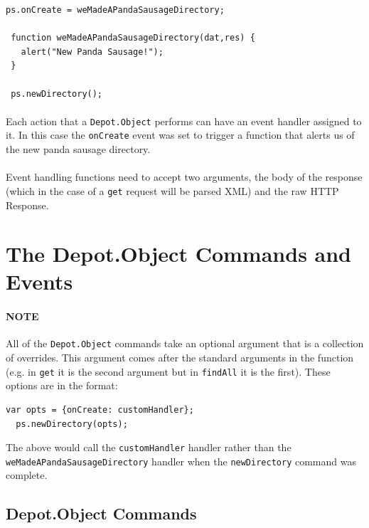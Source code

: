 \documentclass{report}
\begin{document}
\begin{Verbatim}[frame=single]
 ps.onCreate = weMadeAPandaSausageDirectory;

 function weMadeAPandaSausageDirectory(dat,res) {
   alert("New Panda Sausage!");
 }

 ps.newDirectory();
\end{Verbatim}
\paragraph{}
Each action that a \texttt{Depot.Object} performs can have an event
handler assigned to it. In this case the \texttt{onCreate} event was
set to trigger a function that alerts us of the new panda sausage
directory.

\paragraph{}
Event handling functions need to accept two arguments, the body of the
response (which in the case of a \texttt{get} request will be parsed
XML) and the raw HTTP Response.

\section{The Depot.Object Commands and Events}

\paragraph{NOTE} All of the \texttt{Depot.Object} commands take an
optional argument that is a collection of overrides. This argument
comes after the standard arguments in the function (e.g. in
\texttt{get} it is the second argument but in \texttt{findAll} it is
the first). These options are in the format: 

\begin{Verbatim}[frame=single]
  var opts = {onCreate: customHandler};
  ps.newDirectory(opts);
\end{Verbatim}

The above would call the \texttt{customHandler} handler rather than
the \texttt{weMadeAPandaSausageDirectory} handler when the
\texttt{newDirectory} command was complete.

\subsection{Depot.Object Commands}
\end{document}
